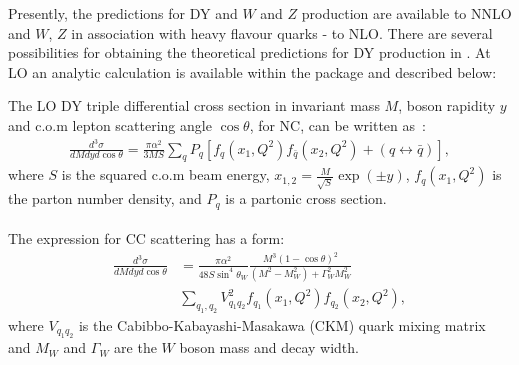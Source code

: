 Presently, the predictions for DY and $W$ and $Z$ production are available
to NNLO and $W$, $Z$ in association with heavy flavour quarks - to NLO. There are several possibilities 
for obtaining the theoretical
predictions for DY production in \fitter. 
At LO an analytic calculation is available within the package and described
below: 

The LO DY triple differential cross section in
invariant mass \(M\), boson rapidity \(y\) and c.o.m 
lepton scattering  angle \(\cos\theta\), for NC, 
can be written as~\cite{Drell:1970wh,Yamada:1981mw}:
\begin{align}
 \textstyle
 \frac{d^3\sigma}{dM{d}y d\cos\theta} =  
 \frac{\pi\alpha^2}{3MS}\sum_{q}P_q \left[f_q(x_1,Q^2)f_{\bar{q}}(x_2,Q^2) 
 + (q\leftrightarrow\bar{q})\right],
\end{align}
where \(S\) is the squared c.o.m beam energy, \(x_{1,2} = \frac{M}{\sqrt{S}}\exp(\pm y)\), $f_q(x_1,Q^2)$ 
is the parton number density, and 
$P_q$ is a partonic cross section. 
%
\\
\\
The expression for CC  scattering has a form:
\begin{align}
\frac{d^3\sigma}{dMdyd\cos\theta} &=
 \frac{\pi\alpha^2}{48S\sin^4\theta_W}
 \frac{M^3(1-\cos\theta)^2}{(M^2-M_W^2)+\Gamma_W^2M_W^2}  \nonumber \\
 & \sum_{q_1,q_2}V_{q_1q_2}^2f_{q_1}(x_1,Q^2)f_{q_2}(x_2,Q^2),
\end{align}
where \(V_{q_1q_2}\) is the Cabibbo-Kabayashi-Masakawa (CKM) quark mixing matrix and \(M_W\) and \(\Gamma_W\)
are the \(W\) boson mass and decay width.

